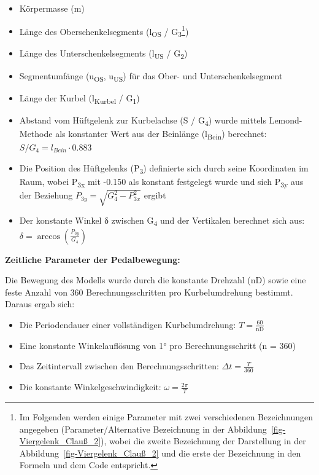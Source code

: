 \documentclass[
  letterpaper,
  DIV=11]{scrartcl}
\providecommand{\tightlist}{%
  \setlength{\itemsep}{0pt}\setlength{\parskip}{0pt}}\usepackage{longtable,booktabs,array}
\begin{document}
\begin{itemize}
\tightlist
\item
  Körpermasse (m)
\item
  Länge des Oberschenkelsegments (l\textsubscript{OS} /
  G\textsubscript{3}\footnote{Im Folgenden werden einige Parameter mit
    zwei verschiedenen Bezeichnungen angegeben (Parameter/Alternative
    Bezeichnung in der Abbildung~\ref{fig-Viergelenk_Clauß_2}), wobei
    die zweite Bezeichnung der Darstellung in der
    Abbildung~\ref{fig-Viergelenk_Clauß_2} und die erste der Bezeichnung
    in den Formeln und dem Code entspricht.})
\item
  Länge des Unterschenkelsegments (l\textsubscript{US} /
  G\textsubscript{2})\\
\item
  Segmentumfänge (u\textsubscript{OS}, u\textsubscript{US}) für das
  Ober- und Unterschenkelsegment
\item
  Länge der Kurbel (l\textsubscript{Kurbel} / G\textsubscript{1})
\item
  Abstand vom Hüftgelenk zur Kurbelachse (S / G\textsubscript{4}) wurde
  mittels Lemond-Methode als konstanter Wert aus der Beinlänge
  (l\textsubscript{Bein}) berechnet: \(S/G_{4} = l_{Bein} \cdot 0.883\)
\item
  Die Position des Hüftgelenks (P\textsubscript{3}) definierte sich
  durch seine Koordinaten im Raum, wobei P\textsubscript{3x} mit -0.150
  als konstant festgelegt wurde und sich P\textsubscript{3y} aus der
  Beziehung \(P_{3y} = \sqrt{G_{4}^2 - P_{3x}^2}\) ergibt
\item
  Der konstante Winkel δ zwischen G\textsubscript{4} und der Vertikalen
  berechnet sich aus: \(\delta = \arccos(\frac{P_{3y}}{G_4})\)
\end{itemize}

\textbf{Zeitliche Parameter der Pedalbewegung:}

Die Bewegung des Modells wurde durch die konstante Drehzahl (nD) sowie
eine feste Anzahl von 360 Berechnungsschritten pro Kurbelumdrehung
bestimmt. Daraus ergab sich:

\begin{itemize}
\tightlist
\item
  Die Periodendauer einer vollständigen Kurbelumdrehung:
  \(T = \frac{60}{\text{nD}}\)
\item
  Eine konstante Winkelauflösung von 1° pro Berechnungsschritt (n = 360)
\item
  Das Zeitintervall zwischen den Berechnungsschritten:
  \(\Delta t = \frac{T}{360}\)
\item
  Die konstante Winkelgeschwindigkeit: \(\omega = \frac{2\pi}{T}\)
\end{itemize}
\end{document}
